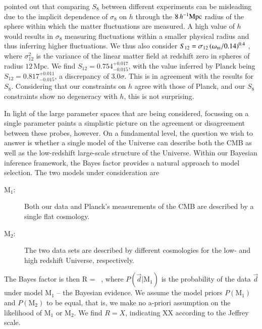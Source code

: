 \citet{Sanchez2020} pointed out that comparing $S_{8}$ between different experiments can be misleading due to the implicit dependence of $\sigma_{8}$ on $h$ through the $8\,h^{-1}{\rm Mpc}$ radius of the sphere within which the matter fluctuations are measured. 
A high value of $h$ would results in $\sigma_{8}$ measuring fluctuations within a smaller physical radius and thus inferring higher fluctuations. 
We thus also consider $S_{12} = \sigma_{12}\left(\omega_{\rm m}/0.14\right)^{0.4}$ \citep{Sanchez2020}, where $\sigma_{12}^{2}$ is the variance of the linear matter field at redshift zero in spheres of radius $12\,\mathrm{Mpc}$.
We find $S_{12} = 0.754^{+0.017}_{-0.015}$, with the value inferred by Planck being $S_{12} = 0.817_{-0.015}^{+0.011}
$, a discrepancy of $3.0\sigma$. 
This is in agreement with the results for $S_{8}$. 
Considering that our \tttp constraints on $h$ agree with those of Planck, and our $S_{8}$ constraints show no degeneracy with $h$, this is not surprising.

In light of the large parameter spaces that are being considered, focussing on a single parameter paints a simplistic picture on the agreement or disagreement between these probes, however. 
On a fundamental level, the question we wish to answer is whether a single model of the Universe can describe both the CMB as well as the low-redshift large-scale structure of the Universe.
Within our Bayesian inference framework, the Bayes factor provides a natural approach to model selection. 
The two models under consideration are 
\begin{description}
	\item[$\mathrm{M}_1$:] Both our \tttp data and Planck's measurements of the CMB are described by a single flat \LCDM cosmology.
	\item[$\mathrm{M}_2$:] The two data sets are described by different cosmologies for the low- and high redshift Universe, respectively.
\end{description}
The Bayes factor is then
\be
	R =  \ ,
\ee
where $P(\vec d | \mathrm{M}_1)$ is the probability of the data $\vec d$ under model $\mathrm{M}_1$ -- the Bayesian evidence. 
We assume the model priors $P(\mathrm{M}_1)$ and $P(\mathrm{M}_2)$ to be equal, that is, we make no a-priori assumption on the likelihood of $\mathrm{M}_1$ or $\mathrm{M}_2$. 
We find $R=X$, indicating XX according to the Jeffrey scale. 

